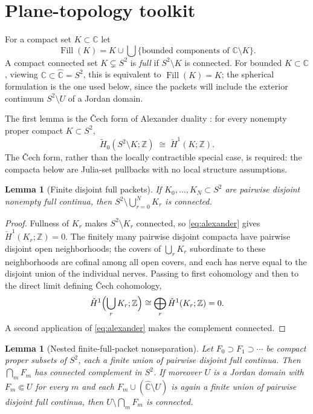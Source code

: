 \documentclass[11pt,reqno]{amsart}
\numberwithin{equation}{section}
\theoremstyle{plain}
\newtheorem{lemma}[theorem]{Lemma}
\theoremstyle{definition}
\theoremstyle{remark}
\DeclareMathOperator{\Fill}{Fill}
\newcommand{\Chat}{\widehat{\mathbb C}}
\newcommand{\C}{\mathbb C}
\newcommand{\Z}{\mathbb Z}
\begin{document}
\section{Plane-topology toolkit}
\label{sec:toolkit}

For a compact set $K\subset\C$ let
\begin{equation}
 \Fill(K)=K\cup\bigcup
 \{\text{bounded components of }\C\setminus K\}.
\label{eq:fill}
\end{equation}
A compact connected set $K\subsetneq S^2$ is \emph{full} if
$S^2\setminus K$ is connected.  For bounded $K\subset\C$, viewing
$\C\subset\Chat=S^2$, this is equivalent to $\Fill(K)=K$; the spherical
formulation is the one used below, since the packets will include the
exterior continuum $S^2\setminus U$ of a Jordan domain.

The first lemma is the \v Cech form of Alexander duality
\cite[pp.~256--257]{Hatcher02}: for every nonempty proper compact
$K\subset S^2$,
\begin{equation}
 \widetilde H_0(S^2\setminus K;\Z)
 \;\cong\;
 \check H^1(K;\Z).
\label{eq:alexander}
\end{equation}
The \v Cech form, rather than the locally contractible special case, is
required: the compacta below are Julia-set pullbacks with no local
structure assumptions.

\begin{lemma}[Finite disjoint full packets]
\label{lem:disjoint-full-complement}
If $K_0,\ldots,K_N\subset S^2$ are pairwise disjoint nonempty full
continua, then $S^2\setminus\bigcup_{r=0}^NK_r$ is connected.
\end{lemma}

\begin{proof}
Fullness of $K_r$ makes $S^2\setminus K_r$ connected, so
\eqref{eq:alexander} gives $\check H^1(K_r;\Z)=0$.  The finitely many
pairwise disjoint compacta have pairwise disjoint open neighborhoods;
the covers of $\bigcup_rK_r$ subordinate to these neighborhoods are
cofinal among all open covers, and each has nerve equal to the disjoint
union of the individual nerves.  Passing to first cohomology and then to
the direct limit defining \v Cech cohomology,
\[
 \check H^1\Bigl(\bigcup_rK_r;\Z\Bigr)
 \cong
 \bigoplus_r\check H^1(K_r;\Z)=0 .
\]
A second application of \eqref{eq:alexander} makes the complement
connected.
\end{proof}

\begin{lemma}[Nested finite-full-packet nonseparation]
\label{lem:nested-full-packets}
Let $F_0\supset F_1\supset\cdots$ be compact proper subsets of $S^2$,
each a finite union of pairwise disjoint full continua.  Then
$\bigcap_mF_m$ has connected complement in $S^2$.  If moreover $U$ is a
Jordan domain with $F_m\Subset U$ for every $m$ and each
$F_m\cup(\Chat\setminus U)$ is again a finite union of pairwise disjoint
full continua, then $U\setminus\bigcap_mF_m$ is connected.
\end{lemma}
\end{document}
